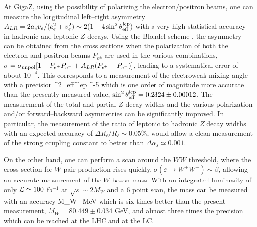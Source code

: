 At GigaZ, using the possibility of polarizing the electron/positron beams, one
can measure the longitudinal left--right asymmetry
$A_{LR}=2a_ev_e/(a_e^2+v_e^2) \sim 2(1-4\sin^2\theta_{\rm eff}^{\rm lep})$ with
a very high statistical accuracy in hadronic and leptonic $Z$ decays. Using the
Blondel scheme \cite{Blondel}, the asymmetry can be obtained from the cross
sections when the polarization of both the electron and positron beams
$P_{e^\pm}$ are used in the various combinations,  $\sigma = \sigma_{\rm unpol}
[1 - P_{e^+} P_{e^-} + A_{LR} ( P_{e^+} - P_{e^-} )]$, leading to a
systematical error of about $10^{-4}$. This corresponds to a measurement of the
electroweak mixing angle with a precision 
\beq
\Delta \sin^2\theta_{\rm eff}^{\rm lep}  ^{-5}
\eeq
which is one order of magnitude more accurate than the presently measured 
value, $\sin^2\theta_{\rm eff}^{\rm lep} = 0.2324 \pm 0.00012$. The measurement
of the total and partial $Z$ decay widths and the various polarization and/or 
forward--backward asymmetries can be significantly improved. In particular, the
measurement of the ratio of leptonic to hadronic $Z$ decay widths with an 
expected accuracy of $\Delta R_\ell/R_\ell \sim 0.05\%$, would allow a clean 
measurement of the strong coupling constant to better than $\Delta \alpha_s
\simeq 0.001$. \s

On the other hand, one can perform a scan around the $WW$ threshold, where
the cross section for $W$ pair production rises quickly, $\sigma(\ee \to W^+W^-)
\sim \beta$, allowing an accurate measurement of the $W$ boson mass. With an
integrated luminosity of only ${\cal L} \simeq 100$ fb$^{-1}$ at $\sqrt{s}\sim 
2M_W$ and a 6 point scan, the mass can be measured with an accuracy
\beq
\Delta M_W ~{\rm MeV}
\eeq
which is six times better than the present measurement, $M_W = 80.449 \pm 
0.034$ GeV, and almost three times the precision which can be reached at 
the LHC and at the LC.\s 


